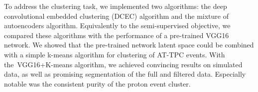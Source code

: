 To address the clustering task, we implemented two algorithms: the deep convolutional embedded clustering (DCEC) algorithm and the mixture of autoencoders algorithm. Equivalently to the semi-supervised objective, we compared these algorithms with the performance of a pre-trained VGG16 network. We showed that the pre-trained network latent space could be combined with a simple k-means algorithm for clustering of AT-TPC events. With the VGG16+K-means algorithm, we achieved convincing results on simulated data, as well as promising segmentation of the full and filtered data. Especially notable was the consistent purity of the proton event cluster. 
